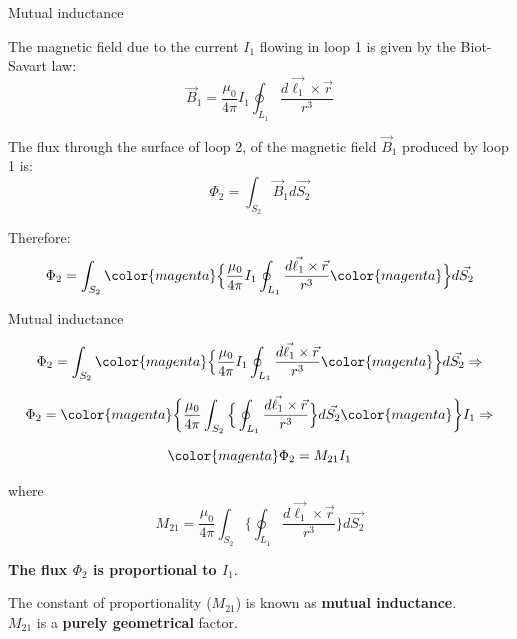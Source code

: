 %
%
%

\begin{frame}{Mutual inductance}


The magnetic field due to the current $I_1$ flowing in loop 1 is given by the Biot-Savart law:
\begin{equation*}
  \vec{B}_1 = \frac{\mu_0}{4\pi} I_1 \oint_{L_1} \frac{d\vec{\ell_1} \times \vec{r}}{r^3}
\end{equation*}

The flux through the surface of loop 2, of the magnetic field $\vec{B}_1$ produced by loop 1 is:
\begin{equation*}
  \Phi_2 = \int_{S_2} \vec{B}_1 d\vec{S_2}
\end{equation*}

Therefore:
\begin{equation*}
  \Phi_2 = \int_{S_2}
      {\color{magenta} \Big\{ }
        \frac{\mu_0}{4\pi} I_1 \oint_{L_1} \frac{d\vec{\ell_1} \times \vec{r}}{r^3}
      {\color{magenta} \Big\} } d\vec{S_2}
\end{equation*}

\end{frame}

%
%
%

\begin{frame}{Mutual inductance}

\begin{equation*}
  \Phi_2 = \int_{S_2}
      {\color{magenta} \Big\{ }
        \frac{\mu_0}{4\pi} I_1 \oint_{L_1} \frac{d\vec{\ell_1} \times \vec{r}}{r^3}
      {\color{magenta} \Big\} } d\vec{S_2} \Rightarrow
\end{equation*}

\begin{equation*}
  \Phi_2 = {\color{magenta}\bigg\{ }
                   \frac{\mu_0}{4\pi} \int_{S_2} \Big\{ \oint_{L_1} \frac{d\vec{\ell_1} \times \vec{r}}{r^3} \Big\} d\vec{S_2}
                 {\color{magenta}\bigg\} }  I_1 \Rightarrow
\end{equation*}

\begin{equation*}
   {\color{magenta} \Phi_2 = M_{21}  I_1 }
\end{equation*}

where
\begin{equation*}
  M_{21}  =  \frac{\mu_0}{4\pi} \int_{S_2} \Big\{ \oint_{L_1} \frac{d\vec{\ell_1} \times \vec{r}}{r^3} \Big\} d\vec{S_2}
\end{equation*}

\vspace{0.3cm}

{\bf The flux $\Phi_2$ is proportional to $I_1$}.\\
\vspace{0.2cm}

The constant of proportionality ($M_{21}$) is known as {\bf mutual inductance}.\\
$M_{21}$  is a {\bf purely geometrical} factor.

\end{frame}

